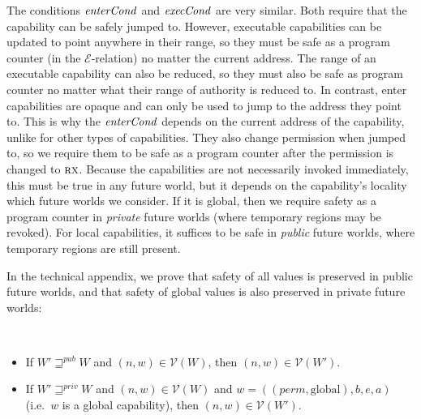 \documentclass[format=acmsmall, review=true, screen=true]{acmart}
\newcommand{\var}[1]{\mathit{#1}}
\newcommand{\gl}{\var{g}}
\newcommand{\addr}{\var{a}}
\newcommand{\start}{\var{b}}
\newcommand{\addrend}{\var{e}}
\newcommand{\perm}{\var{perm}}
\newcommand{\stdcap}[1][(\perm,\gl)]{\left(#1,\start,\addrend,\addr \right)}
\newcommand{\plainfun}[2]{
  \ifthenelse{\equal{#2}{}}
  {\mathit{#1}}
  {\mathit{#1}(#2)}
}
\newcommand{\execCond}[1]{\plainfun{execCond}{#1}}
\newcommand{\entryCond}[1]{\plainfun{enterCond}{#1}}
\newcommand{\futurewk}{\mathbin{\sqsupseteq}^{\var{pub}}}
\newcommand{\futurestr}{\mathbin{\sqsupseteq}^{\var{priv}}}
\newcommand{\asmType}{\plaindom{AsmType}}
\newcommand{\plaindom}[1]{\mathrm{#1}}
\newcommand{\intr}[2]{\mathcal{#1}}
\newcommand{\valueintr}[1]{\intr{V}{#1}}
\newcommand{\exprintr}[1]{\intr{E}{#1}}
\newcommand{\stdvr}{\valueintr{\asmType}}
\newcommand{\stder}{\exprintr{\asmType}}
\newcommand{\npair}[2][n]{\left(#1,#2 \right)}
\newcommand{\plainperm}[1]{\textsc{#1}}
\newcommand{\exec}{\plainperm{rx}}
\newcommand{\plainlocality}[1]{\mathrm{#1}}
\newcommand{\glob}{\plainlocality{global}}
\newenvironment{toplas}%
    {\color{OliveGreen}}{}
\newcommand{\itoplas}[1]%
    {{\color{OliveGreen} #1}}
\begin{document}
The conditions $\entryCond{}$ and $\execCond{}$ are very similar. Both require
that the capability can be safely jumped to. However, executable capabilities
can be updated to point anywhere in their range, so they must be safe as a
program counter (in the $\stder$-relation) no matter the current address.
\itoplas{The range of an executable capability can also be reduced, so they must also be safe as program counter no matter what their range of authority is reduced to.}
In contrast, enter capabilities are opaque and can only be used to jump to the
address they point to.%
\begin{toplas}%
  This is why the $\entryCond{}$ depends on the current address of the capability, unlike for other types of capabilities.
\end{toplas}
They also change permission when jumped to, so we require
them to be safe as a program counter after the permission is changed to $\exec$.
Because the capabilities are not necessarily invoked immediately, this must be
true in any future world, but it depends on the capability's locality which
future worlds we consider. If it is global, then we require safety as a program
counter in \emph{private} future worlds (where temporary regions may be
revoked). For local capabilities, it suffices to be safe in \emph{public} future
worlds, where temporary regions are still present.

In the technical appendix, we prove that safety of all values is
preserved in public future worlds, and that safety of global values is
also preserved in private future worlds:
\begin{lemma}~
  \begin{itemize}
  \item If $W' \futurewk W$ and $\npair{w} \in \stdvr(W)$, then $\npair{w} \in
    \stdvr(W')$.
  \item If $W' \futurestr W$ and $\npair{w} \in \stdvr(W)$ and $w =
    \stdcap[(\perm,\glob)]$ (i.e.\ $w$ is a global capability), then $\npair{w}
    \in \stdvr(W')$.
  \end{itemize}
\end{lemma}
\end{document}
